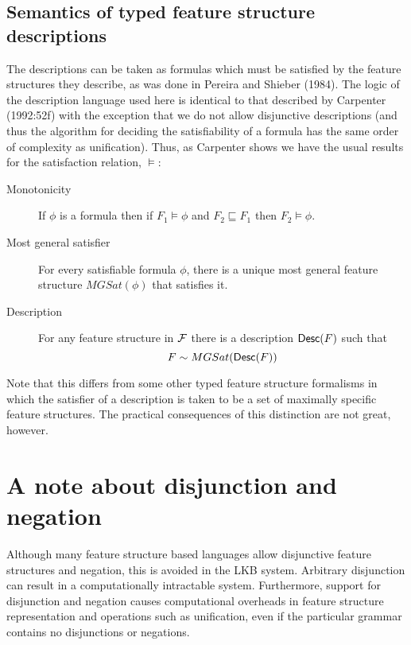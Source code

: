 \documentclass[12pt]{report}
\begin{document}

\subsection{Semantics of typed feature structure descriptions}
\label{descsem}

The descriptions can be taken as formulas which must be 
satisfied by the feature structures they describe, as was done in
Pereira and Shieber (1984). 
The logic of the description language used here
is identical to that described by 
Carpenter (1992:52f) with the exception that we do not 
allow disjunctive descriptions
(and thus the algorithm for deciding the
satisfiability of a formula
has the same order of complexity as unification).
Thus, as Carpenter shows we have the usual results for the satisfaction
relation, $\models$:
\begin{description}
\item[Monotonicity]
If $\phi$ is a formula then if
$F_{1}\models\phi$ and $F_{2}\sqsubseteq F_{1}$ then $F_{2}\models 
\phi$.
\item[Most general satisfier]
For every satisfiable formula 
$\phi$, there is a unique most general feature structure $MGSat(\phi)$ that
satisfies it.
\item[Description]
For any feature structure in ${\cal F}$ 
there is a description ${\sf Desc}(F)$ such that
\[ F\sim MGSat({\sf Desc}(F))\]
\end{description}

Note that this differs from some other typed feature structure
formalisms in which the satisfier of a description is taken to be a
set of maximally specific feature structures.  The practical
consequences of this distinction are not great, however.


\section{A note about disjunction and negation}
\label{disj}

Although many feature structure based languages allow disjunctive feature
structures and negation, this is avoided in the LKB system.  
Arbitrary disjunction can result
in a computationally intractable system.
Furthermore, support for disjunction and
negation causes computational overheads in feature structure representation
and operations such as unification, even if the particular grammar
contains no disjunctions or negations.
\end{document}
